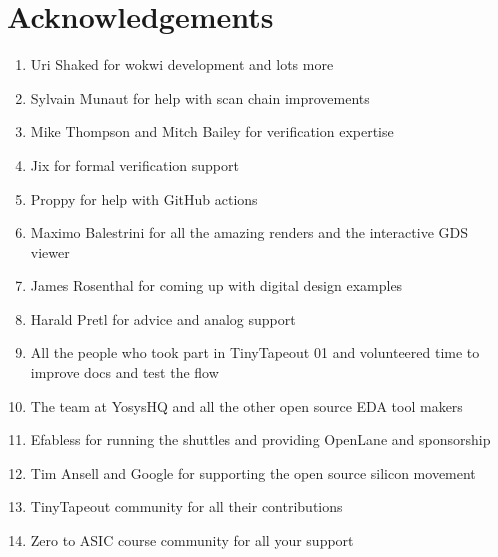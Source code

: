 \section{Acknowledgements}
\label{sec:acknowledgements}

\begin{enumerate}
    \item Uri Shaked for wokwi development and lots more
    \item Sylvain Munaut for help with scan chain improvements
    \item Mike Thompson and Mitch Bailey for verification expertise
    \item Jix for formal verification support
    \item Proppy for help with GitHub actions
    \item Maximo Balestrini for all the amazing renders and the interactive GDS viewer
    \item James Rosenthal for coming up with digital design examples
    \item Harald Pretl for advice and analog support
    \item All the people who took part in TinyTapeout 01 and volunteered time to improve docs and test the flow
    \item The team at YosysHQ and all the other open source EDA tool makers
    \item Efabless for running the shuttles and providing OpenLane and sponsorship
    \item Tim Ansell and Google for supporting the open source silicon movement
    \item TinyTapeout community for all their contributions
    \item Zero to ASIC course community for all your support
\end{enumerate}

